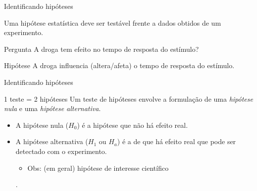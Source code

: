 \documentclass{beamer}
\begin{document}
\begin{frame}{\scriptsize Identificando hipóteses}
  \begin{block}{}
    \footnotesize
    Uma hipótese estatística deve ser testável frente a dados obtidos de um experimento.
  \end{block}
  \bigskip
  \begin{exampleblock}{Pergunta}
    \scriptsize
    A droga tem efeito no tempo de resposta do estímulo?
  \end{exampleblock}
  \bigskip
  \begin{exampleblock}{Hipótese}
    \scriptsize
    A droga influencia ({\tiny altera/afeta}) o tempo de resposta do estímulo.
  \end{exampleblock}
\end{frame}


\begin{frame}{\scriptsize Identificando hipóteses}
  \begin{block}{1 teste = 2 hipóteses}
    \footnotesize
    Um teste de hipóteses envolve a formulação de uma {\em hipótese nula} e uma {\em hipótese alternativa}.
  \end{block}
  \begin{itemize}
    \footnotesize
    \bigskip
  \item A hipótese nula ($H_0$) é a hipótese que não há efeito real.
    \bigskip
  \item A hipótese alternativa ($H_1$ ou $H_a$) é a de que há efeito real \alert{que pode ser detectado} com o experimento.
    \begin{itemize}
    \tiny
    \item Obs: (em geral) hipótese de interesse científico
    \end{itemize}
.
  \end{itemize}
\end{frame}
\end{document}
